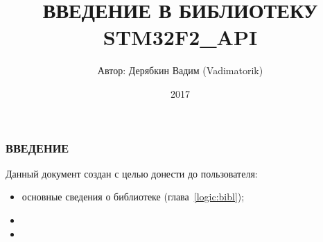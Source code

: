 \documentclass[a4paper, 12pt]{report}		%
\begin{document}
	\title {ВВЕДЕНИЕ В БИБЛИОТЕКУ STM32F2\_API}			%
	\author {Автор: Дерябкин Вадим (Vadimatorik)}
	\date {2017}
	\maketitle

\subsubsection{ВВЕДЕНИЕ}
Данный документ создан с целью донести до пользователя:
\begin{itemize}
	\item основные сведения о библиотеке (глава~\ref{logic:bibl});
	\item 
	\item
\end{itemize}


	\tableofcontents
	\clearpage							%
	
\end{document}
